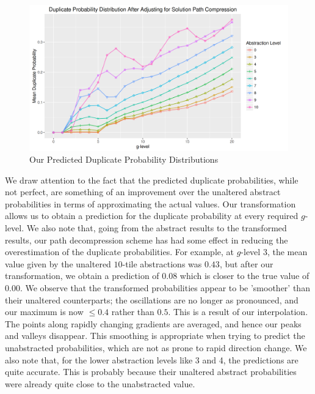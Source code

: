 \documentclass{article}
\begin{document}
\begin{figure}
  \centering
  \includegraphics[width=1\textwidth]{pred_stats_plot}
  \caption{Our Predicted Duplicate Probability Distributions}
  \label{fig:pdpd}
\end{figure}

We draw attention to the fact that the predicted duplicate probabilities,
while not perfect, are something of an improvement over the unaltered abstract probabilities
in terms of approximating the actual values.
Our transformation allows us to obtain a prediction for the duplicate probability at every required \(g\)-level.
We also note that, going from the abstract results to the transformed results,
our path decompression scheme has had some effect in reducing the overestimation of the duplicate probabilities.
For example, at \(g\)-level 3, the mean value given by the unaltered \(10\)-tile abstractions was \(0.43\),
but after our transformation, we obtain a prediction of \(0.08\) which is closer to the true value of \(0.00\).
We observe that the transformed probabilities appear to be 'smoother' than their unaltered counterparts;
the oscillations are no longer as pronounced, and our maximum is now \(\leq 0.4\) rather than \(0.5\).
This is a result of our interpolation. The points along rapidly changing gradients are averaged,
and hence our peaks and valleys disappear.
This smoothing is appropriate when trying to predict the unabstracted probabilities, which are not as prone
to rapid direction change.
We also note that, for the lower abstraction levels like 3 and 4,
the predictions are quite accurate. This is probably because their
unaltered abstract probabilities were already quite close to the unabstracted value. \\
\end{document}
